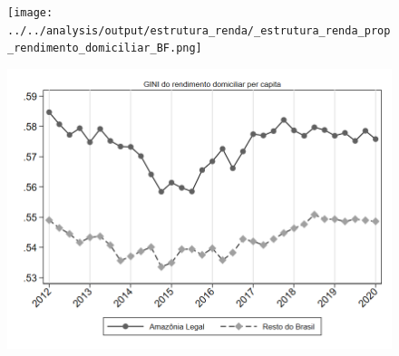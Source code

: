 \begin{frame}[label=_estrutura_renda_prop_rendimento_domiciliar_BF]{}
\textit{\hyperlink{_estrutura_renda}{}}
\begin{figure}
  \centering
  \texttt{[image: ../../analysis/output/estrutura\_renda/\_estrutura\_renda\_prop\_rendimento\_domiciliar\_BF.png]}
  \caption{}
  \label{fig:_estrutura_renda_prop_rendimento_domiciliar_BF}
\end{figure}
\end{frame}

\begin{frame}[label=_estrutura_renda_gini_rendimento_domiciliar_pc]{}
\textit{\hyperlink{_estrutura_renda}{}}
\begin{figure}
  \centering
  \includegraphics[width=1.0\linewidth]{../../analysis/output/estrutura_renda/_estrutura_renda_gini_rendimento_domiciliar_pc.png}
  \caption{}
  \label{fig:_estrutura_renda_gini_rendimento_domiciliar_pc}
\end{figure}
\end{frame}

